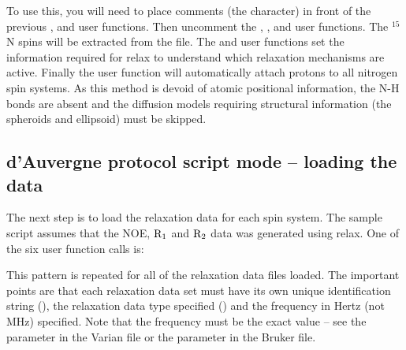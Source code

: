 \begin{htmlonly}
\begin{htmlonly}
To use this, you will need to place comments (the \pycode{\#} character) in front of the previous ,  and  user functions.  Then uncomment the , ,  and  user functions.  The $^{15}$N spins will be extracted from the  file.  The  and  user functions set the information required for relax to understand which relaxation mechanisms are active.  Finally the  user function will automatically attach protons to all nitrogen spin systems.  As this method is devoid of atomic positional information, the N-H bonds are absent and the diffusion models requiring structural information (the spheroids and ellipsoid) must be skipped.



\subsection{d'Auvergne protocol script mode -- loading the data}

The next step is to load the relaxation data for each spin system.  The sample script assumes that the NOE, $\mathrm{R}_1$ and $\mathrm{R}_2$ data was generated using relax.  One of the six user function calls is:


This pattern is repeated for all of the relaxation data files loaded.  The important points are that each relaxation data set must have its own unique identification string (), the relaxation data type specified () and the frequency in Hertz (not MHz) specified.  Note that the frequency must be the exact value -- see the  parameter in the Varian  file or the  parameter in the Bruker  file.



\end{htmlonly}
\end{htmlonly}
